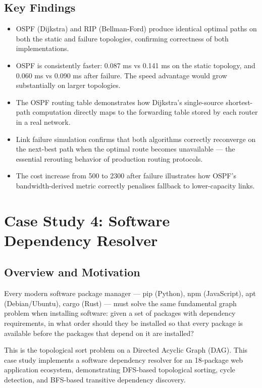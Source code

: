 \documentclass[12pt, a4paper, oneside]{report}
\theoremstyle{definition}
\begin{document}
\section{Key Findings}

\begin{itemize}
    \item OSPF (Dijkstra) and RIP (Bellman-Ford) produce identical optimal paths on both the static and failure topologies, confirming correctness of both implementations.
    \item OSPF is consistently faster: 0.087 ms vs 0.141 ms on the static topology, and 0.060 ms vs 0.090 ms after failure. The speed advantage would grow substantially on larger topologies.
    \item The OSPF routing table demonstrates how Dijkstra's single-source shortest-path computation directly maps to the forwarding table stored by each router in a real network.
    \item Link failure simulation confirms that both algorithms correctly reconverge on the next-best path when the optimal route becomes unavailable — the essential rerouting behavior of production routing protocols.
    \item The cost increase from 500 to 2300 after failure illustrates how OSPF's bandwidth-derived metric correctly penalises fallback to lower-capacity links.
\end{itemize}

\chapter{Case Study 4: Software Dependency Resolver}

\section{Overview and Motivation}

Every modern software package manager — pip (Python), npm (JavaScript), apt (Debian/Ubuntu), cargo (Rust) — must solve the same fundamental graph problem when installing software: given a set of packages with dependency requirements, in what order should they be installed so that every package is available before the packages that depend on it are installed?

This is the topological sort problem on a Directed Acyclic Graph (DAG). This case study implements a software dependency resolver for an 18-package web application ecosystem, demonstrating DFS-based topological sorting, cycle detection, and BFS-based transitive dependency discovery.
\end{document}
